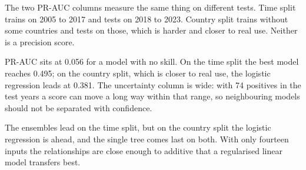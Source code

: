 \documentclass[10pt]{article}
\begin{document}
\begin{table}[htbp]
\centering
\caption{Main results. Every column except Precision and Recall is a 0 to 1 score where
higher is better. The first four columns come from the time split, where the model is tested
on later years. The fifth repeats the main score under the harder country split, where the
model is tested on unseen countries. Precision and Recall describe what happens at the
alert threshold on the time split.}
\small
{}
\end{table}

The two PR-AUC columns measure the same thing on different tests. Time split trains on 2005
to 2017 and tests on 2018 to 2023. Country split trains without some countries and tests on
those, which is harder and closer to real use. Neither is a precision score.

PR-AUC sits at 0.056 for a model with no skill. On the time split the best model reaches
0.495; on the country split, which is closer to real use, the logistic regression leads at
0.381. The uncertainty column is wide: with 74 positives in the test years a score can
move a long way within that range, so neighbouring models should not be separated with
confidence.

The ensembles lead on the time split, but on the country split the logistic regression is
ahead, and the single tree comes last on both. With only fourteen inputs the relationships are
close enough to additive that a regularised linear model transfers best.
\end{document}
